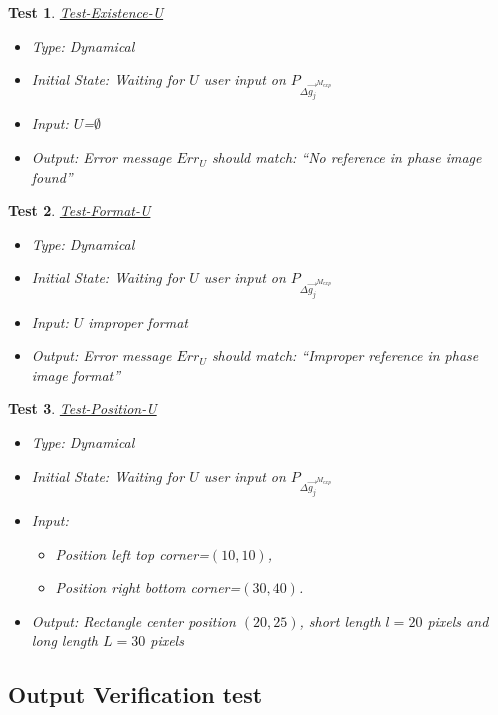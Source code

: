 \documentclass[12pt, titlepage]{article}
\newtheorem{Test}{Test}
\begin{document}
\begin{Test}\normalfont\underline{Test-Existence-U}
\label{Test-Existence-U}
\begin{itemize}
\item Type: Dynamical
\item Initial State: Waiting for $U$ user input on $P_{\Delta \overrightarrow{g_{j}}^{M_{exp}}}$
\item Input: $U$=$\emptyset$
\item Output:  Error message $Err_{U}$ should match: \enquote{No reference in phase image found}
\end{itemize}
\end{Test}

\begin{Test}\normalfont\underline{Test-Format-U}
\label{Test-Format-U}
\begin{itemize}
\item Type: Dynamical
\item Initial State: Waiting for $U$ user input on $P_{\Delta \overrightarrow{g_{j}}^{M_{exp}}}$
\item Input: $U$ improper format
\item Output:  Error message $Err_{U}$ should match: \enquote{Improper reference in phase image format}
\end{itemize}
\end{Test}

\begin{Test}\normalfont\underline{Test-Position-U}
\label{Test-Position-U}
\begin{itemize}
\item Type: Dynamical
\item Initial State: Waiting for $U$ user input on $P_{\Delta \overrightarrow{g_{j}}^{M_{exp}}}$
\item Input: 
	\begin{itemize}
	\item Position left top corner=$(10,10)$, 
	\item Position right bottom corner=$(30,40)$.
	\end{itemize}
\item Output: Rectangle center position $(20,25)$, short length $l=20$ pixels and long length $L=30$ pixels
\end{itemize}
\end{Test}


\subsection{Output Verification test}
\end{document}
